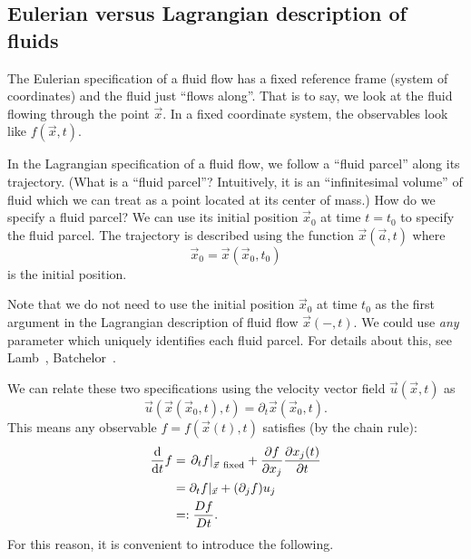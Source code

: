 \subsection{Eulerian versus Lagrangian description of fluids}

\begin{node}
The Eulerian specification of a fluid flow has a fixed reference frame
(system of coordinates) and the fluid just ``flows along''. That is to
say, we look at the fluid flowing through the point $\vec{x}$.
In a fixed coordinate system, the observables look like $f(\vec{x},t)$.
\end{node}

\begin{node}
In the Lagrangian specification of a fluid flow, we follow a ``fluid parcel''
along its trajectory. (What is a ``fluid parcel''? Intuitively, it is
an ``infinitesimal volume'' of fluid which we can treat as a point
located at its center of mass.)
How do we specify a fluid parcel? We can use its initial position
$\vec{x}_{0}$ at time $t=t_{0}$ to specify the fluid parcel. The
trajectory is described using the function $\vec{x}(\vec{a},t)$ where
\begin{equation}
\vec{x}_{0}=\vec{x}(\vec{x}_{0},t_{0})
\end{equation}
is the initial position.

Note that we do not need to use the initial position $\vec{x}_{0}$ at
time $t_{0}$ as the first argument in the Lagrangian description of
fluid flow $\vec{x}(-,t)$. We could use \emph{any} parameter which
uniquely identifies each fluid parcel. For details about this, see
Lamb~\cite[\S16]{lamb1930hydrodynamics},
Batchelor~\cite[\S2.1]{batchelor1973introduction}.
\end{node}

\begin{node}
We can relate these two specifications using the velocity vector field
$\vec{u}(\vec{x},t)$ as
\begin{equation}
\vec{u}(\vec{x}(\vec{x}_{0},t),t)=\partial_{t}\vec{x}(\vec{x}_{0},t).
\end{equation}
This means any observable $f=f(\vec{x}(t),t)$ satisfies (by the chain rule):
\begin{subequations}
  \begin{align}
\frac{\mathrm{d}}{\mathrm{d} t}f 
&=\left.\partial_{t}f\right|_{\vec{x}~\text{fixed}}+\frac{\partial f}{\partial x_{j}}\frac{\partial x_{j}(t)}{\partial t}\\
&=\partial_{t}f|_{\vec{x}}+(\partial_{j}f)u_{j}\\
&=:\frac{D f}{D t}.
  \end{align}
\end{subequations}
For this reason, it is convenient to introduce the following.
\end{node}

